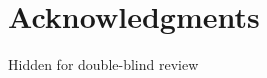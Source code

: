 \documentclass[runningheads,a4paper]{llncs}
\begin{document}




\section*{Acknowledgments}

Hidden for double-blind review




\end{document}
